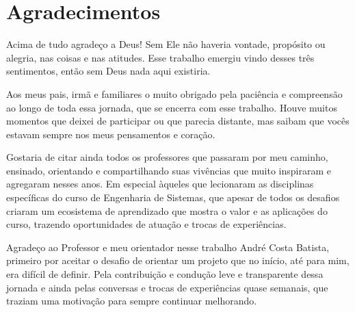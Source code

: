 
\newpage

\chapter*{Agradecimentos} %

	Acima de tudo agradeço a Deus! Sem Ele não haveria vontade, propósito ou alegria, nas coisas e nas atitudes. Esse trabalho emergiu vindo desses três sentimentos, então sem Deus nada aqui existiria.

	Aos meus pais, irmã e familiares o muito obrigado pela paciência e compreensão ao longo de toda essa jornada, que se encerra com esse trabalho. Houve muitos momentos que deixei de participar ou que parecia distante, mas saibam que vocês estavam sempre nos meus pensamentos e coração.
	
	Gostaria de citar ainda todos os professores que passaram por meu caminho, ensinado, orientando e compartilhando suas vivências que muito inspiraram e agregaram nesses anos. Em especial àqueles que lecionaram as disciplinas específicas do curso 
	de Engenharia de Sistemas, que apesar de todos os desafios criaram um ecosistema de aprendizado que mostra o valor e as aplicações do curso, trazendo oportunidades de atuação e trocas de experiências.
	
	Agradeço ao Professor e meu orientador nesse trabalho André Costa Batista, primeiro por aceitar o desafio de orientar um projeto que no início, até para mim, era difícil de definir. Pela contribuição e condução leve e transparente dessa jornada e ainda pelas conversas e trocas de experiências quase semanais, que traziam uma motivação para sempre continuar melhorando. 

	\thispagestyle{empty}